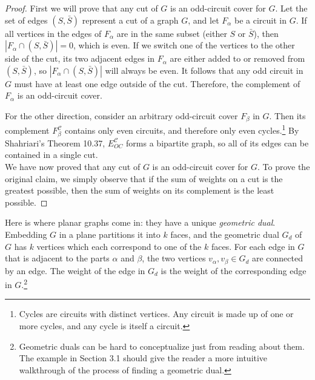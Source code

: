 \begin{proof}
    First we will prove that any cut of $G$ is an odd-circuit cover for $G$. Let the set of edges $(S,\bar{S})$ represent a cut of a graph $G$, and let $F_{\alpha}$ be a circuit in $G$. If all vertices in the edges of $F_{\alpha}$ are in the same subset (either $S$ or $\bar{S}$), then $|F_{\alpha} \cap (S,\bar{S})| = 0$, which is even. If we switch one of the vertices to the other side of the cut, its two adjacent edges in $F_{\alpha}$ are either added to or removed from $(S,\bar{S})$, so $|F_{\alpha} \cap (S,\bar{S})|$ will always be even. It follows that any odd circuit in $G$ must have at least one edge outside of the cut. Therefore, the complement of $F_{\alpha}$ is an odd-circuit cover. \\
    
\newpage
    
    For the other direction, consider an arbitrary odd-circuit cover $F_{\beta}$ in $G$. Then its complement $F_{\beta}^{\mathcal{C}}$ contains only even circuits, and therefore only even cycles.\footnote{Cycles are circuits with distinct vertices. Any circuit is made up of one or more cycles, and any cycle is itself a circuit.} By Shahriari's Theorem 10.37,\cite{Shahriari} $E_{OC}^{\mathcal{C}}$ forms a bipartite graph, so all of its edges can be contained in a single cut. \\
    
    We have now proved that any cut of $G$ is an odd-circuit cover for $G$. To prove the original claim, we simply observe that if the sum of weights on a cut is the greatest possible, then the sum of weights on its complement is the least possible.
\end{proof}

\par Here is where planar graphs come in: they have a unique \textit{geometric dual}. Embedding $G$ in a plane partitions it into $k$ faces, and the geometric dual $G_d$ of $G$ has $k$ vertices which each correspond to one of the $k$ faces. For each edge in $G$ that is adjacent to the parts $\alpha$ and $\beta$, the two vertices $v_{\alpha},v_{\beta} \in G_d$ are connected by an edge. The weight of the edge in $G_d$ is the weight of the corresponding edge in $G$.\footnote{Geometric duals can be hard to conceptualize just from reading about them. The example in Section 3.1 should give the reader a more intuitive walkthrough of the process of finding a geometric dual.} \\

